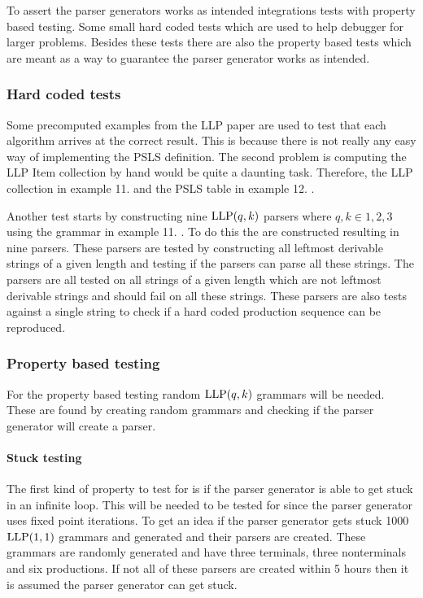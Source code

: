 To assert the parser generators works as intended integrations tests with property based testing. Some small hard coded tests which are used to help debugger for larger problems. Besides these tests there are also the property based tests which are meant as a way to guarantee the parser generator works as intended.

\subsubsection{Hard coded tests}
Some precomputed examples from the LLP paper \cite{Vagner2007} are used to test that each algorithm arrives at the correct result. This is because there is not really any easy way of implementing the PSLS definition. The second problem is computing the LLP Item collection by hand would be quite a daunting task. Therefore, the LLP collection in example 11. \cite[14]{Vagner2007} and the PSLS table in example 12. \cite[14]{Vagner2007}.

Another test starts by constructing nine $\text{LLP}(q, k)$ parsers where $q, k \in {1, 2, 3}$ using the grammar in example 11. \cite[14]{Vagner2007}. To do this the are constructed resulting in nine parsers. These parsers are tested by constructing all leftmost derivable strings of a given length and testing if the parsers can parse all these strings. The parsers are all tested on all strings of a given length which are not leftmost derivable strings and should fail on all these strings. These parsers are also tests against a single string to check if a hard coded production sequence can be reproduced.

\subsubsection{Property based testing}
For the property based testing random $\text{LLP}(q,k)$ grammars will be needed. These are found by creating random grammars and checking if the parser generator will create a parser.

\paragraph{Stuck testing}
The first kind of property to test for is if the parser generator is able to get stuck in an infinite loop. This will be needed to be tested for since the parser generator uses fixed point iterations. To get an idea if the parser generator gets stuck 1000 $\text{LLP}(1, 1)$ grammars and generated and their parsers are created. These grammars are randomly generated and have three terminals, three nonterminals and six productions. If not all of these parsers are created within 5 hours then it is assumed the parser generator can get stuck.

